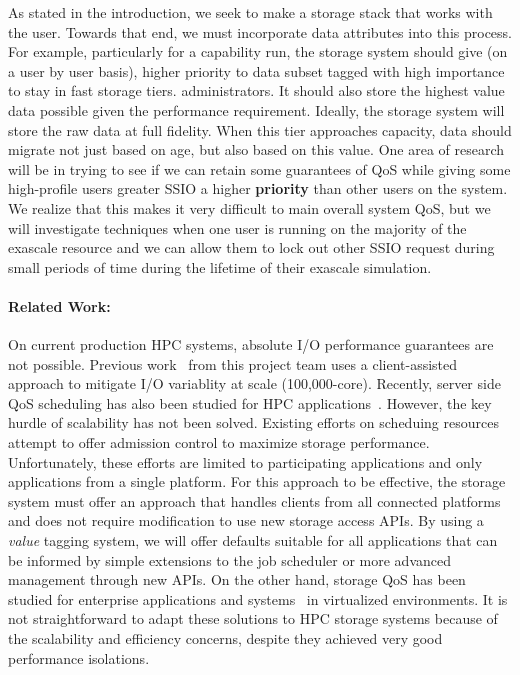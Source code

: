 As stated in the introduction, we seek to make a storage stack that works with
the user. Towards that end, we must incorporate data attributes into this
process. For example, particularly for a capability run, the storage system
should give (on a user by user basis), higher priority to data subset tagged with high importance to stay in fast
storage tiers.
administrators.
 It should also store the highest value data possible given
the performance requirement. Ideally, the storage system will store the raw
data at full fidelity. When this tier approaches capacity, data should migrate
not just based on age, but also based on this value. One area of research will be in
trying to see if we can retain some guarantees of QoS while giving some high-profile users
greater SSIO a higher {\bf priority} than other users on the system. We realize that this makes
it very difficult to main overall system QoS, but we will investigate techniques when one
user is running on the majority of the exascale resource and we can allow them to lock out other SSIO
request during small periods of time during the lifetime of their exascale simulation.


\paragraph{Related Work:}
On current production HPC systems, absolute I/O performance guarantees are not
possible. Previous work~\cite{lofstead:2010:io-variability,liu_hotstorage} from
this project team uses a client-assisted approach to mitigate I/O variablity at
scale (100,000-core).  Recently, server side QoS scheduling has also been
studied for HPC applications~\cite{Dai:2014}.  However, the key hurdle of
scalability has not been solved.  Existing efforts on scheduing
resources~\cite{thapaliya:2014:io-cop,dorier:2014:calciom} attempt to offer
admission control to maximize storage performance. Unfortunately, these efforts
are limited to participating applications and only applications from a single
platform. For this approach to be effective, the storage system must offer an
approach that handles clients from all connected platforms and does not require
modification to use new storage access APIs. By using a {\it value} tagging
system, we will offer defaults suitable for all applications that can be
informed by simple extensions to the job scheduler or more advanced management
through new APIs. On the other hand, storage QoS has been studied for
enterprise applications and systems~\cite{Gulati:2007,Gulati:2010,Gulati:2012}
in virtualized environments. It is not straightforward to adapt these solutions
to HPC storage systems because of the scalability and efficiency concerns,
despite they achieved very good performance isolations.

